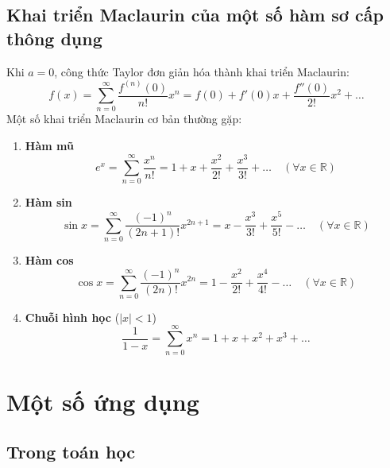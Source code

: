\documentclass[12pt]{article}
\theoremstyle{definition}
\theoremstyle{remark}
\begin{document}
\subsection{Khai triển Maclaurin của một số hàm sơ cấp thông dụng}

Khi $a = 0$, công thức Taylor đơn giản hóa thành khai triển Maclaurin:
\begin{equation}
f(x) = \sum_{n=0}^{\infty} \frac{f^{(n)}(0)}{n!} x^n = f(0) + f'(0)x + \frac{f''(0)}{2!}x^2 + \dots
\end{equation}
Một số khai triển Maclaurin cơ bản thường gặp:
\begin{enumerate}
    \item \textbf{Hàm mũ} 
    \begin{equation}
    e^x = \sum_{n=0}^{\infty} \frac{x^n}{n!} = 1 + x + \frac{x^2}{2!} + \frac{x^3}{3!} + \dots \quad (\forall x \in \mathbb{R})
    \end{equation}
    
    \item \textbf{Hàm sin}
    \begin{equation}
    \sin x = \sum_{n=0}^{\infty} \frac{(-1)^n}{(2n+1)!} x^{2n+1} = x - \frac{x^3}{3!} + \frac{x^5}{5!} - \dots \quad (\forall x \in \mathbb{R})
    \end{equation}
    
    \item \textbf{Hàm cos}
    \begin{equation}
    \cos x = \sum_{n=0}^{\infty} \frac{(-1)^n}{(2n)!} x^{2n} = 1 - \frac{x^2}{2!} + \frac{x^4}{4!} - \dots \quad (\forall x \in \mathbb{R})
    \end{equation}
    
    \item \textbf{Chuỗi hình học} ($|x|<1$)
    \begin{equation}
    \frac{1}{1 - x} = \sum_{n=0}^{\infty} x^n = 1 + x + x^2 + x^3 + \dots
    \end{equation}
\end{enumerate}
\section{Một số ứng dụng}
\subsection{Trong toán học}
\end{document}
